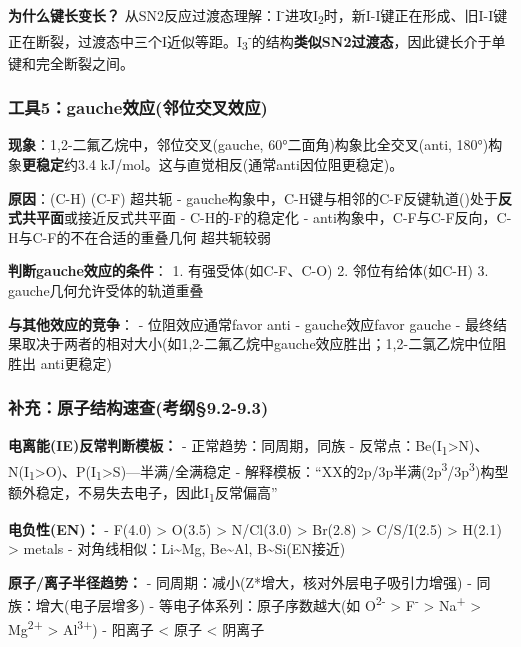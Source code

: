 \textbf{为什么键长变长？} 从SN2反应过渡态理解：I\textsuperscript{-}进攻I\textsubscript{2}时，新I-I键正在形成、旧I-I键正在断裂，过渡态中三个I近似等距。I\textsubscript{3}\textsuperscript{-}的结构\textbf{类似SN2过渡态}，因此键长介于单键和完全断裂之间。

\subsubsection{工具5：gauche效应(邻位交叉效应)}\label{ux5de5ux51775gaucheux6548ux5e94ux90bbux4f4dux4ea4ux53c9ux6548ux5e94}

\textbf{现象}：1,2-二氟乙烷中，邻位交叉(gauche, 60°二面角)构象比全交叉(anti, 180°)构象\textbf{更稳定}约3.4 kJ/mol。这与直觉相反(通常anti因位阻更稳定)。

\textbf{原因}：(C-H) \箭 (C-F) 超共轭
- gauche构象中，C-H键与相邻的C-F反键轨道()处于\textbf{反式共平面}或接近反式共平面
- C-H的-F的 \箭 稳定化
- anti构象中，C-F与C-F反向，C-H与C-F的不在合适的重叠几何 \箭 超共轭较弱

\textbf{判断gauche效应的条件}：
1. 有强受体(如C-F、C-O)
2. 邻位有给体(如C-H)
3. gauche几何允许受体的轨道重叠

\textbf{与其他效应的竞争}：
- 位阻效应通常favor anti
- gauche效应favor gauche
- 最终结果取决于两者的相对大小(如1,2-二氟乙烷中gauche效应胜出；1,2-二氯乙烷中位阻胜出 \箭 anti更稳定)

\subsubsection{补充：原子结构速查(考纲§9.2-9.3)}\label{ux8865ux5145ux539fux5b50ux7ed3ux6784ux901fux67e5ux8003ux7eb29.2-9.3}

\textbf{电离能(IE)反常判断模板：}
- 正常趋势：同周期，同族
- 反常点：Be(I\textsubscript{1}\textgreater N)、N(I\textsubscript{1}\textgreater O)、P(I\textsubscript{1}\textgreater S)---半满/全满稳定
- 解释模板：``XX的2p/3p半满(2p\textsuperscript{3}/3p\textsuperscript{3})构型额外稳定，不易失去电子，因此I\textsubscript{1}反常偏高''

\textbf{电负性(EN)：}
- F(4.0) \textgreater{} O(3.5) \textgreater{} N/Cl(3.0) \textgreater{} Br(2.8) \textgreater{} C/S/I(2.5) \textgreater{} H(2.1) \textgreater{} metals
- 对角线相似：Li\textasciitilde Mg, Be\textasciitilde Al, B\textasciitilde Si(EN接近)

\textbf{原子/离子半径趋势：}
- 同周期：减小(Z*增大，核对外层电子吸引力增强)
- 同族：增大(电子层增多)
- 等电子体系列：原子序数越大(如 O\textsuperscript{2-} \textgreater{} F\textsuperscript{-} \textgreater{} Na\textsuperscript{+} \textgreater{} Mg\textsuperscript{2+} \textgreater{} Al\textsuperscript{3+})
- 阳离子 \textless{} 原子 \textless{} 阴离子

